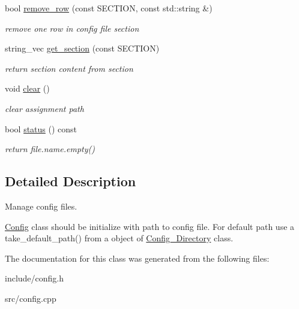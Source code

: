 \begin{DoxyCompactItemize}
bool \mbox{\hyperlink{class_config_a9db2df151d53943ec0c02358cdc6c8e0}{remove\+\_\+row}} (const S\+E\+C\+T\+I\+ON, const std\+::string \&)
\begin{DoxyCompactList}\small\item\em remove one row in config file section \end{DoxyCompactList}\item 
\mbox{\label{class_config_a6f868d196b3590d940e91e31c98ab85b}} 
string\+\_\+vec \mbox{\hyperlink{class_config_a6f868d196b3590d940e91e31c98ab85b}{get\+\_\+section}} (const S\+E\+C\+T\+I\+ON)
\begin{DoxyCompactList}\small\item\em return section content from section \end{DoxyCompactList}\item 
\mbox{\label{class_config_a4d4698876d10131043806b0ddd690eb3}} 
void \mbox{\hyperlink{class_config_a4d4698876d10131043806b0ddd690eb3}{clear}} ()
\begin{DoxyCompactList}\small\item\em clear assignment path \end{DoxyCompactList}\item 
\mbox{\label{class_config_a170d9cc2b65ee82abcf7f1ed91e7ee5c}} 
bool \mbox{\hyperlink{class_config_a170d9cc2b65ee82abcf7f1ed91e7ee5c}{status}} () const
\begin{DoxyCompactList}\small\item\em return file.\+name.\+empty() \end{DoxyCompactList}\end{DoxyCompactItemize}


\subsection{Detailed Description}
Manage config files. 

\mbox{\hyperlink{class_config}{Config}} class should be initialize with path to config file. For default path use a take\+\_\+default\+\_\+path() from a object of \mbox{\hyperlink{class_config___directory}{Config\+\_\+\+Directory}} class. 

The documentation for this class was generated from the following files\+:\begin{DoxyCompactItemize}
\item 
include/config.\+h\item 
src/config.\+cpp\end{DoxyCompactItemize}
